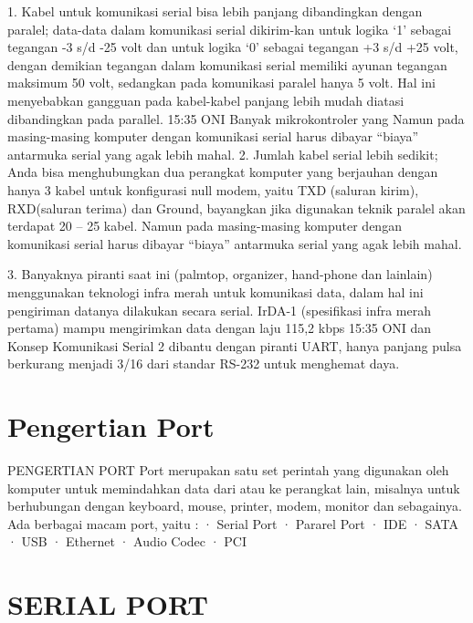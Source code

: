{{1. Kabel untuk komunikasi serial bisa lebih panjang dibandingkan dengan paralel; data-data dalam komunikasi serial dikirim-kan untuk logika ‘1’ sebagai tegangan -3 s/d -25 volt dan untuk logika ‘0’ sebagai tegangan +3 s/d +25 volt, dengan demikian tegangan dalam komunikasi serial memiliki ayunan tegangan maksimum 50 volt, sedangkan pada komunikasi paralel hanya 5 volt. Hal ini menyebabkan gangguan pada kabel-kabel panjang lebih mudah diatasi dibandingkan pada parallel.
15:35 ONI Banyak mikrokontroler yang Namun pada masing-masing komputer dengan komunikasi serial harus dibayar “biaya” antarmuka serial yang agak lebih mahal.
2. Jumlah kabel serial lebih sedikit; Anda bisa menghubungkan dua perangkat komputer yang berjauhan dengan hanya 3 kabel untuk konfigurasi null modem, yaitu TXD (saluran kirim), RXD(saluran terima) dan Ground, bayangkan jika digunakan teknik paralel akan terdapat 20 – 25 kabel. Namun pada masing-masing komputer dengan komunikasi serial harus dibayar “biaya” antarmuka serial yang agak lebih mahal.

3. Banyaknya piranti saat ini (palmtop, organizer, hand-phone dan lainlain) menggunakan teknologi infra merah untuk komunikasi data, dalam hal ini pengiriman datanya dilakukan secara serial. IrDA-1 (spesifikasi infra merah pertama) mampu mengirimkan data dengan laju 115,2 kbps
15:35 ONI dan Konsep Komunikasi Serial 2 dibantu dengan piranti UART, hanya panjang pulsa berkurang menjadi 3/16 dari standar RS-232 untuk menghemat daya.









\section {Pengertian Port}
PENGERTIAN  PORT
Port merupakan satu set perintah yang digunakan oleh komputer untuk memindahkan data dari atau ke perangkat lain, misalnya untuk berhubungan dengan keyboard, mouse, printer, modem, monitor dan sebagainya. Ada berbagai macam port, yaitu :
·         Serial Port
·         Pararel Port
·         IDE
·         SATA
·         USB
·         Ethernet
·         Audio Codec
·         PCI

\section {SERIAL PORT }

}}
